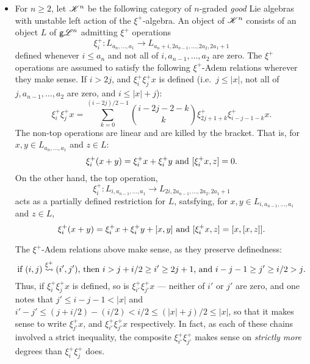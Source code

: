 \documentclass[11pt]{article}
\newcommand{\GoodLie}[1]{\mathsf{g}{\scrL}^{#1}}%
\newcommand{\LL}[1]{{\scrK}^{#1}}%
\newcommand{\produces}[1]{\overset{#1}{\rightsquigarrow}}
\newcommand{\LambdaOp}{\xi^{+}}
\begin{document}
\begin{itemize}
\item For $n\geq2$, let $\LL{n}$ be the following category of $n$-graded \emph{good} Lie algebras with unstable left action of the $\LambdaOp$-algebra. An object of $\LL{n}$ consists of an object $L$ of $\GoodLie{n}$
admitting $\LambdaOp$ operations
\[\LambdaOp_i:L_{a_n,\ldots,a_1}\to L_{a_n+i,2a_{n-1},\ldots,2a_2,2a_1+1}\]
defined whenever $i\leq a_n$ and not all of $i,a_{n-1},\ldots,a_{2}$ are zero. %
The $\LambdaOp$ operations are assumed to satisfy the following $\LambdaOp$-Adem relations wherever they make sense. If $i>2j$, and $\LambdaOp_i\LambdaOp_jx$ is defined (i.e.\ $j\leq|x|$, not all of $j,a_{n-1},\ldots,a_2$ are zero, and $i\leq|x|+j$):
\[\LambdaOp_i\LambdaOp_jx=\sum_{k=0}^{(i-2j)/2-1}{i-2j-2-k\choose k}\LambdaOp_{2j+1+k}\LambdaOp_{i-j-1-k}x.\]
The non-top operations are linear and are killed by the bracket.
That is, for $x,y\in L_{a_n,\ldots,a_1}$ and $z\in L$: \[\LambdaOp_i{(x+y)}=\LambdaOp_i{x}+\LambdaOp_i{y}\textup{ and }[\LambdaOp_i{x},z]=0.\]
On the other hand, the top operation, 
\[\LambdaOp_i:L_{i, a_{n-1},\ldots,a_1}\to L_{2i, 2a_{n-1},\ldots,2a_2,2a_1+1}\]
acts as a partially defined restriction for $L$, satsfying, for $x,y\in L_{i, a_{n-1},\ldots,a_1}$ and $z\in L$,
\[\LambdaOp_i(x+y)=\LambdaOp_ix+\LambdaOp_iy+[x,y]\textup{ and }[\LambdaOp_{i}x,z]=[x,[x,z]].\]

\begin{shaded}\noindent
The $\LambdaOp$-Adem relations above make sense, as they preserve definedness:
\[\textup{if $(i,j)\produces{\LambdaOp}(i',j')$, then $i>j+i/2\geq i'\geq2j+1$, and $i-j-1\geq j'\geq i/2>j$.}\]
Thus, if $\LambdaOp_i\LambdaOp_jx$ is defined, so is $\LambdaOp_{i'}\LambdaOp_{j'}x$ --- neither of $i'$ or $j'$ are zero, and one notes that $j'\leq i-j-1<|x|$ and $i'-j'\leq (j+i/2)-(i/2)<i/2\leq(|x|+j)/2\leq |x|$, so that it makes sense to write $\LambdaOp_{j'}x$, and $\LambdaOp_{i'}\LambdaOp_{j'}x$ respectively. In fact, as each of these chains involved a strict inequality, the composite $\LambdaOp_{i'}\LambdaOp_{j'}$ makes sense on \emph{strictly more} degrees than $\LambdaOp_{i}\LambdaOp_{j}$ does.
\end{shaded}


\end{itemize}
\end{document}
